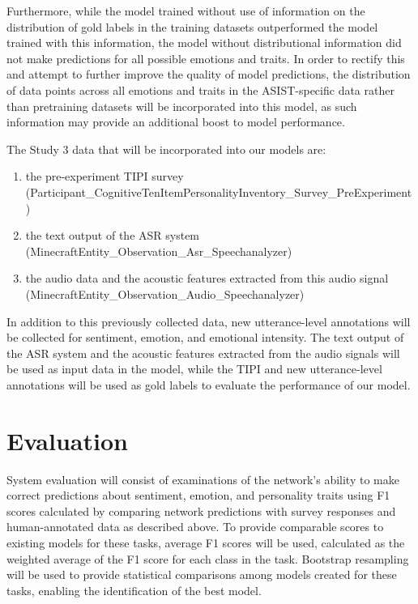 Furthermore, while the model trained without use of information on the distribution
of gold labels in the training datasets outperformed the model trained with this
information, the model without distributional information did not make predictions
for all possible emotions and traits. In order to rectify this and attempt to
further improve the quality of model predictions, the distribution of data points
across all emotions and traits in the ASIST-specific data rather than pretraining
datasets will be incorporated into this model, as such information may provide an
additional boost to model performance.

The Study 3 data that will be incorporated into our models are:

\begin{enumerate}
    \item the
pre-experiment TIPI survey \\
(Participant\_CognitiveTenItemPersonalityInventory\_Survey\_PreExperiment)
    \item the
text output of the ASR system \\
(MinecraftEntity\_Observation\_Asr\_Speechanalyzer)
    \item the audio data and the
acoustic features extracted from this audio signal
(MinecraftEntity\_Observation\_Audio\_Speechanalyzer)
\end{enumerate}

In addition to this previously collected data, new
utterance-level annotations will be collected for sentiment, emotion, and
emotional intensity. The text output of the ASR system and the acoustic features
extracted from the audio signals will be used as input data in the model,
while the TIPI and new utterance-level annotations will be used as gold labels
to evaluate the performance of our model.

\section{Evaluation}

System evaluation will consist of examinations of the network's ability to make
correct predictions about sentiment, emotion, and personality traits using F1
scores calculated by comparing network predictions with survey responses and
human-annotated data as described above. To provide comparable scores to
existing models for these tasks, average F1 scores will be used, calculated as
the weighted average of the F1 score for each class in the task.  Bootstrap
resampling \cite{kohavi1995study} will be used to provide statistical
comparisons among models created for these tasks, enabling the identification
of the best model.

